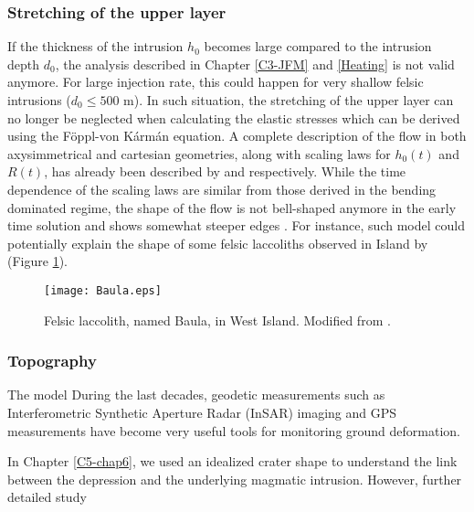 \subsubsection*{Stretching of the upper layer}
\label{subsubsection}

If the thickness of the intrusion  $h_0$ becomes large compared to the
intrusion depth $d_0$, the  analysis described in Chapter \ref{C3-JFM}
and \ref{Heating} is not valid anymore. For large injection rate, this
could happen for very shallow  felsic intrusions ($d_0\le 500$ m).  In
such situation,  the stretching of  the upper  layer can no  longer be
neglected when calculating  the elastic stresses which  can be derived
using the  Föppl-von Kármán  equation. A  complete description  of the
flow  in  both axysimmetrical  and  cartesian  geometries, along  with
scaling laws  for $h_0(t)$ and  $R(t)$, has already been  described by
\citet{Lister:2013ia}  and   \citet{Anonymous:QWXp_4JV}  respectively.
While the time  dependence of the scaling laws are  similar from those
derived in the bending dominated regime,  the shape of the flow is not
bell-shaped  anymore in  the early  time solution  and shows  somewhat
steeper  edges \citep{Anonymous:QWXp_4JV}.   For instance,  such model
could potentially explain the shape of some felsic laccoliths observed
in Island by \citet{Anonymous:jHnLP36x} (Figure \ref{C7-Baula}).

\begin{figure}[h!]
  \begin{center}
    \graphicspath{ {/Users/thorey/Documents/These/Manuscript/Figure/Chapter7/} }
    \texttt{[image: Baula.eps]}
    \caption{Felsic laccolith, named Baula, in West Island. Modified
      from \citet{Anonymous:jHnLP36x}.}
    \label{C7-Baula}
  \end{center}
\end{figure}

\subsubsection*{Topography}
\label{sec:topography-1}

The model 
During the last decades, geodetic measurements such as Interferometric
Synthetic  Aperture Radar  (InSAR) imaging  and GPS  measurements have
become very useful tools for monitoring ground deformation. 


In  Chapter  \ref{C5-chap6}, we  used  an  idealized crater  shape  to
understand the link between the depression and the underlying magmatic
intrusion. However, further detailed study 

